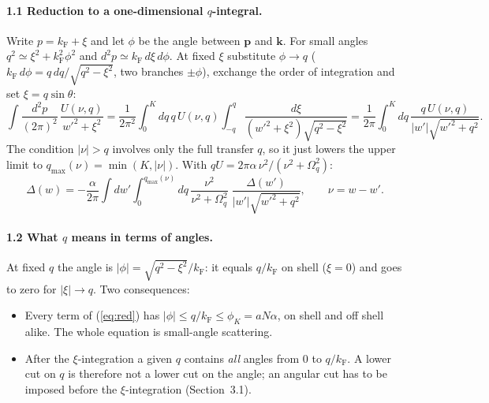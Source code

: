 \documentclass[11pt]{article}
\newcommand{\kF}{k_{\mathrm F}}
\begin{document}
\paragraph{1.1 Reduction to a one-dimensional $q$-integral.}
Write $p=\kF+\xi$ and let $\phi$ be the angle between $\mathbf p$ and $\mathbf k$. For small
angles $q^2\simeq\xi^2+\kF^2\phi^2$ and $d^2p\simeq\kF\,d\xi\,d\phi$. At fixed $\xi$
substitute $\phi\to q$ ($\kF\,d\phi=q\,dq/\sqrt{q^2-\xi^2}$, two branches $\pm\phi$),
exchange the order of integration and set $\xi=q\sin\theta$:
\begin{equation}
\int\!\frac{d^2p}{(2\pi)^2}\,\frac{U(\nu,q)}{w'^2+\xi^2}
=\frac{1}{2\pi^2}\int_0^{K}\!dq\,q\,U(\nu,q)\int_{-q}^{q}\frac{d\xi}{(w'^2+\xi^2)\sqrt{q^2-\xi^2}}
=\frac{1}{2\pi}\int_0^{K}\!dq\,\frac{q\,U(\nu,q)}{|w'|\sqrt{w'^2+q^2}} .
\label{eq:exact}
\end{equation}
The condition $|\nu|>q$ involves only the full transfer $q$, so it just lowers the upper limit
to $q_{\max}(\nu)=\min(K,|\nu|)$. With $qU=2\pi\alpha\,\nu^2/(\nu^2+\Omega_q^2)$:
\begin{equation}
\boxed{\;\Delta(w)=-\frac{\alpha}{2\pi}\int dw'\int_0^{q_{\max}(\nu)}\!dq\,
\frac{\nu^2}{\nu^2+\Omega_q^2}\;\frac{\Delta(w')}{|w'|\sqrt{w'^2+q^2}},
\qquad\nu=w-w'.\;}
\label{eq:red}
\end{equation}

\paragraph{1.2 What $q$ means in terms of angles.}
At fixed $q$ the angle is $|\phi|=\sqrt{q^2-\xi^2}/\kF$: it equals $q/\kF$ on shell
($\xi=0$) and goes to zero for $|\xi|\to q$. Two consequences:
\begin{itemize}
\item[(a)] Every term of (\ref{eq:red}) has $|\phi|\le q/\kF\le\phi_K=aN\alpha$, on shell and
off shell alike. The whole equation is small-angle scattering.
\item[(b)] After the $\xi$-integration a given $q$ contains \emph{all} angles from $0$ to
$q/\kF$. A lower cut on $q$ is therefore not a lower cut on the angle; an angular cut has to
be imposed before the $\xi$-integration (Section~3.1).
\end{itemize}
\end{document}
